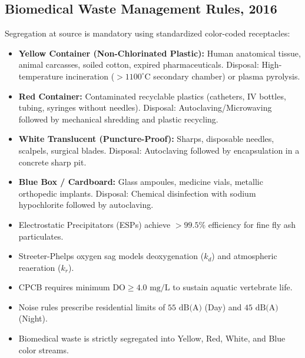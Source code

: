 \subsection{Biomedical Waste Management Rules, 2016}
Segregation at source is mandatory using standardized color-coded receptacles:
\begin{itemize}[leftmargin=1.5em]
    \item \textbf{Yellow Container (Non-Chlorinated Plastic):} Human anatomical tissue, animal carcasses, soiled cotton, expired pharmaceuticals. Disposal: High-temperature incineration ($>1100^\circ\text{C}$ secondary chamber) or plasma pyrolysis.
    \item \textbf{Red Container:} Contaminated recyclable plastics (catheters, IV bottles, tubing, syringes without needles). Disposal: Autoclaving/Microwaving followed by mechanical shredding and plastic recycling.
    \item \textbf{White Translucent (Puncture-Proof):} Sharps, disposable needles, scalpels, surgical blades. Disposal: Autoclaving followed by encapsulation in a concrete sharp pit.
    \item \textbf{Blue Box / Cardboard:} Glass ampoules, medicine vials, metallic orthopedic implants. Disposal: Chemical disinfection with sodium hypochlorite followed by autoclaving.
\end{itemize}

\begin{quickrevision}
\begin{itemize}[leftmargin=1.2em]
    \item Electrostatic Precipitators (ESPs) achieve $>99.5\%$ efficiency for fine fly ash particulates.
    \item Streeter-Phelps oxygen sag models deoxygenation ($k_d$) and atmospheric reaeration ($k_r$).
    \item CPCB requires minimum $\text{DO} \ge 4.0\text{ mg/L}$ to sustain aquatic vertebrate life.
    \item Noise rules prescribe residential limits of $55\text{ dB(A)}$ (Day) and $45\text{ dB(A)}$ (Night).
    \item Biomedical waste is strictly segregated into Yellow, Red, White, and Blue color streams.
\end{itemize}
\end{quickrevision}
